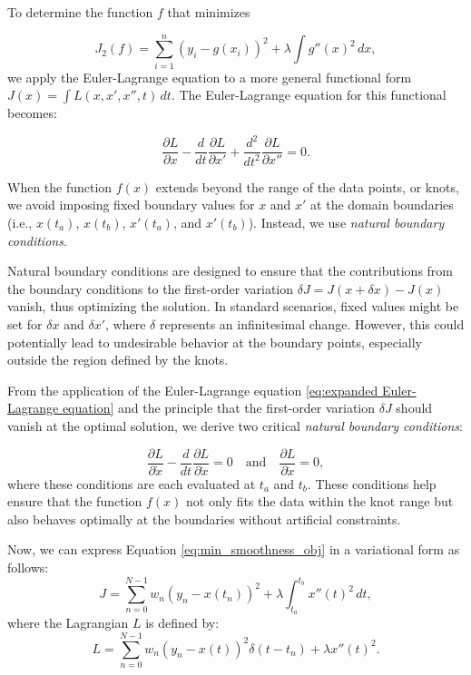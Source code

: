 \documentclass[
11pt, %
oneside, %
english, %
singlespacing, %
]{macthesis} %
\begin{document}
To determine the function \(f\) that minimizes

\[
J_{2}(f) = \sum_{i=1}^n (y_i - g(x_i))^2 + \lambda \int g''(x)^2 \, dx,
\]
we apply the Euler-Lagrange equation to a more general functional form \(J(x) = \int L(x, x', x'', t) \, dt\). The Euler-Lagrange equation for this functional becomes:

\begin{equation}
\frac{\partial L}{\partial x} - \frac{d}{dt} \frac{\partial L}{\partial x'} + \frac{d^2}{dt^2} \frac{\partial L}{\partial x''} = 0.
\label{eq:expanded Euler-Lagrange equation}
\end{equation}

When the function \(f(x)\) extends beyond the range of the data points, or knots, we avoid imposing fixed boundary values for \(x\) and \(x'\) at the domain boundaries (i.e., \(x(t_a)\), \(x(t_b)\), \(x'(t_a)\), and \(x'(t_b)\)). Instead, we use \emph{natural boundary conditions}.

Natural boundary conditions are designed to ensure that the contributions from the boundary conditions to the first-order variation \(\delta J = J(x + \delta x) - J(x)\) vanish, thus optimizing the solution. In standard scenarios, fixed values might be set for \(\delta x\) and \(\delta x'\), where \(\delta\) represents an infinitesimal change. However, this could potentially lead to undesirable behavior at the boundary points, especially outside the region defined by the knots.

From the application of the Euler-Lagrange equation \ref{eq:expanded Euler-Lagrange equation} and the principle that the first-order variation \(\delta J\) should vanish at the optimal solution, we derive two critical \emph{natural boundary conditions}:

\[
\frac{\partial L}{\partial \dot{x}} - \frac{d}{dt} \frac{\partial L}{\partial \ddot{x}} = 0 \quad \text{and} \quad \frac{\partial L}{\partial \ddot{x}} = 0,
\]
where these conditions are each evaluated at \(t_a\) and \(t_b\). These conditions help ensure that the function \(f(x)\) not only fits the data within the knot range but also behaves optimally at the boundaries without artificial constraints.

Now, we can express Equation \ref{eq:min_smoothness_obj} in a variational form as follows:
\[
J = \sum_{n=0}^{N-1} w_n (y_n - x(t_n))^2 + \lambda \int_{t_a}^{t_b} x''(t)^2 \, dt,
\]
where the Lagrangian \(L\) is defined by:
\[
L = \sum_{n=0}^{N-1} w_n(y_n - x(t))^2 \delta(t - t_n) + \lambda x''(t)^2.
\]
\end{document}
